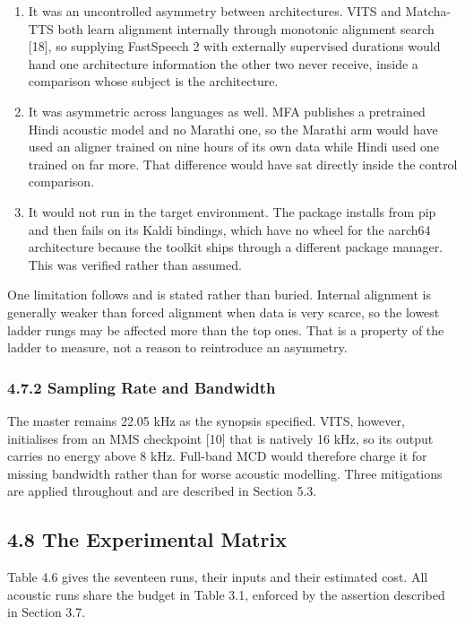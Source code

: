 \documentclass[12pt,a4paper]{article}
\begin{document}
\begin{enumerate}[leftmargin=1.9em,itemsep=2pt,topsep=3pt]
  \item It was an uncontrolled asymmetry between architectures. VITS and Matcha-TTS both learn alignment internally through monotonic alignment search [18], so supplying FastSpeech 2 with externally supervised durations would hand one architecture information the other two never receive, inside a comparison whose subject is the architecture.
  \item It was asymmetric across languages as well. MFA publishes a pretrained Hindi acoustic model and no Marathi one, so the Marathi arm would have used an aligner trained on nine hours of its own data while Hindi used one trained on far more. That difference would have sat directly inside the control comparison.
  \item It would not run in the target environment. The package installs from pip and then fails on its Kaldi bindings, which have no wheel for the aarch64 architecture because the toolkit ships through a different package manager. This was verified rather than assumed.
\end{enumerate}

One limitation follows and is stated rather than buried. Internal alignment is generally weaker than forced alignment when data is very scarce, so the lowest ladder rungs may be affected more than the top ones. That is a property of the ladder to measure, not a reason to reintroduce an asymmetry.

\subsubsection*{4.7.2  Sampling Rate and Bandwidth}
The master remains 22.05 kHz as the synopsis specified. VITS, however, initialises from an MMS checkpoint [10] that is natively 16 kHz, so its output carries no energy above 8 kHz. Full-band MCD would therefore charge it for missing bandwidth rather than for worse acoustic modelling. Three mitigations are applied throughout and are described in Section 5.3.

\subsection*{4.8  The Experimental Matrix}
Table 4.6 gives the seventeen runs, their inputs and their estimated cost. All acoustic runs share the budget in Table 3.1, enforced by the assertion described in Section 3.7.
\end{document}

